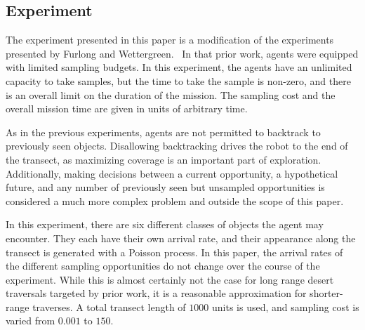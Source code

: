 \subsection{Experiment}


The experiment presented in this paper is a modification of the experiments
presented by Furlong and Wettergreen.~\cite{furlong2014sequential,furlong2014budgeting}  In
that prior work, agents were equipped with limited sampling budgets.  In this
experiment, the agents have an unlimited capacity to take samples, but the time
to take the sample is non-zero, and there is an overall limit on the duration of
the mission.  The sampling cost and the overall mission time are given in units of arbitrary time.

As in the previous experiments, agents are not permitted to backtrack to previously seen objects.  Disallowing backtracking drives the robot to the end of the transect, as maximizing coverage is an
important part of exploration.  Additionally, making decisions
between a current opportunity, a hypothetical future, and any number of
previously seen but unsampled opportunities is considered a much more complex
problem and outside the scope of this paper.

In this experiment, there are six different classes of objects the agent may
encounter.  They each have their own arrival rate, and their appearance along
the transect is generated with a Poisson process.  In this paper, the arrival
rates of the different sampling opportunities do not change over the course of
the experiment.  While this is almost certainly not the case for long range desert
traversals targeted by prior work, it is a
reasonable approximation for shorter-range traverses.  A total transect length of $1000$ units is used, and sampling cost is varied from $0.001$ to $150$.

